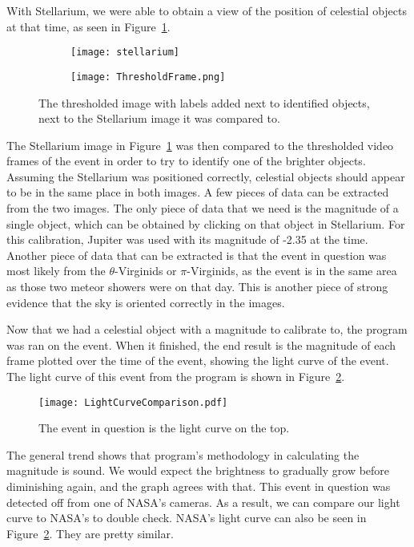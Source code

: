 With Stellarium, we were able to obtain a view of the position of celestial objects at that time, as seen in Figure~\ref{fig:Starposition}.
\begin{figure}
\centering
\begin{subfigure}{.4\textwidth}
	\centering
	\texttt{[image: stellarium]}
\end{subfigure}%
\begin{subfigure}{.4\textwidth}
	\centering
	\texttt{[image: ThresholdFrame.png]}
\end{subfigure}
\caption{The thresholded image with labels added next to identified objects, next to the Stellarium image it was compared to.}
\label{fig:Starposition}
\end{figure}
The Stellarium image in Figure~\ref{fig:Starposition} was then compared to the thresholded video frames of the event in order to try to identify one of the brighter objects. Assuming the Stellarium was positioned correctly, celestial objects should appear to be in the same place in both images. A few pieces of data can be extracted from the two images. The only piece of data that we need is the magnitude of a single object, which can be obtained by clicking on that object in Stellarium. For this calibration, Jupiter was used with its magnitude of -2.35 at the time. Another piece of data that can be extracted is that the event in question was most likely from the $\theta$-Virginids or $\pi$-Virginids, as the event is in the same area as those two meteor showers were on that day. This is another piece of strong evidence that the sky is oriented correctly in the images.

Now that we had a celestial object with a magnitude to calibrate to, the program was ran on the event. When it finished, the end result is the magnitude of each frame plotted over the time of the event, showing the light curve of the event. The light curve of this event from the program is shown in Figure~\ref{fig:nasa}. 
\begin{figure}[ht!]
	\centering
	\texttt{[image: LightCurveComparison.pdf]}
	\caption{The event in question is the light curve on the top.}
	\label{fig:nasa}
\end{figure}
The general trend shows that program's methodology in calculating the magnitude is sound. We would expect the brightness to gradually grow before diminishing again, and the graph agrees with that. This event in question was detected off from one of NASA's cameras. As a result, we can compare our light curve to NASA's to double check. NASA's light curve can also be seen in Figure~\ref{fig:nasa}. They are pretty similar.


